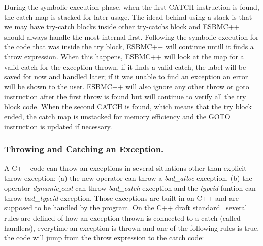 \documentclass[a4paper]{llncs}
\begin{document}
During the symbolic execution phase, when the first 
CATCH instruction is found, the catch map is stacked 
for later usage. The idead behind using a stack is 
that we may have try-catch blocks inside other 
try-catchs block and ESBMC++ should always handle 
the most internal first. Following the symbolic execution 
for the code that was inside the try block, ESBMC++ will continue 
untill it finds a throw expression. When this happens, ESBMC++ will 
look at the map for a valid catch for the exception thrown, if it finds 
a valid catch, the label will be saved for now and handled later; 
if it was unable to find an exception an error will be shown to the user. 
ESBMC++ will also ignore any other throw or goto instruction after 
the first throw is found but will continue to verify all the try 
block code. When the second CATCH is found, which means that the try 
block ended, the catch map is unstacked for memory efficiency 
and the GOTO instruction is updated if necessary.

\subsubsection{Throwing and Catching an Exception.}
A C++ code can throw an exceptions in several situations other 
than explicit throw exception: (a) the new operator can throw a \textit{bad\_alloc}
exception, (b) the operator \textit{dynamic$\_$cast} can throw \textit{bad\_catch} 
exception and the \textit{typeid} funtion can throw \textit{bad\_typeid} exception. 
Those exceptions are built-in on C++ and are supposed to be handled by the program.
On the C++ draft standard~\cite{CppDraft} several rules are defined of how an exception 
thrown is connected to a catch (called handlers), everytime an exception is thrown and 
one of the following rules is true, the code will jump from the throw expression to the catch code:
\end{document}
